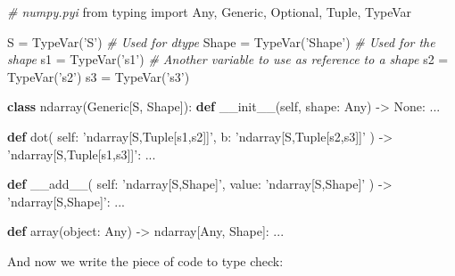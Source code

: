 \documentclass[
11pt, %
english, %
singlespacing, %
headsepline, %
]{MastersDoctoralThesis} %
\newenvironment{Shaded}{}{}
\newcommand{\BuiltInTok}[1]{#1}
\newcommand{\CommentTok}[1]{\textcolor[rgb]{0.38,0.63,0.69}{\textit{#1}}}
\newcommand{\FunctionTok}[1]{\textcolor[rgb]{0.02,0.16,0.49}{#1}}
\newcommand{\ImportTok}[1]{#1}
\newcommand{\KeywordTok}[1]{\textcolor[rgb]{0.00,0.44,0.13}{\textbf{#1}}}
\newcommand{\NormalTok}[1]{#1}
\newcommand{\OperatorTok}[1]{\textcolor[rgb]{0.40,0.40,0.40}{#1}}
\newcommand{\StringTok}[1]{\textcolor[rgb]{0.25,0.44,0.63}{#1}}
\newcommand{\VariableTok}[1]{\textcolor[rgb]{0.10,0.09,0.49}{#1}}
\begin{document}
\begin{Shaded}
\begin{Highlighting}[]
\CommentTok{# numpy.pyi}
\ImportTok{from}\NormalTok{ typing }\ImportTok{import}\NormalTok{ Any, Generic, Optional, Tuple, TypeVar}

\NormalTok{S }\OperatorTok{=}\NormalTok{ TypeVar(}\StringTok{'S'}\NormalTok{)  }\CommentTok{# Used for dtype}
\NormalTok{Shape }\OperatorTok{=}\NormalTok{ TypeVar(}\StringTok{'Shape'}\NormalTok{)  }\CommentTok{# Used for the shape}
\NormalTok{s1 }\OperatorTok{=}\NormalTok{ TypeVar(}\StringTok{'s1'}\NormalTok{)  }\CommentTok{# Another variable to use as reference to a shape}
\NormalTok{s2 }\OperatorTok{=}\NormalTok{ TypeVar(}\StringTok{'s2'}\NormalTok{)}
\NormalTok{s3 }\OperatorTok{=}\NormalTok{ TypeVar(}\StringTok{'s3'}\NormalTok{)}


\KeywordTok{class}\NormalTok{ ndarray(Generic[S, Shape]):}
    \KeywordTok{def} \FunctionTok{__init__}\NormalTok{(}\VariableTok{self}\NormalTok{, shape: Any) }\OperatorTok{->} \VariableTok{None}\NormalTok{: ...}

    \KeywordTok{def}\NormalTok{ dot(}
            \VariableTok{self}\NormalTok{: }\StringTok{'ndarray[S,Tuple[s1,s2]]'}\NormalTok{,}
\NormalTok{            b: }\StringTok{'ndarray[S,Tuple[s2,s3]]'}
\NormalTok{    ) }\OperatorTok{->} \StringTok{'ndarray[S,Tuple[s1,s3]]'}\NormalTok{: ...}

    \KeywordTok{def} \FunctionTok{__add__}\NormalTok{(}
            \VariableTok{self}\NormalTok{: }\StringTok{'ndarray[S,Shape]'}\NormalTok{,}
\NormalTok{            value: }\StringTok{'ndarray[S,Shape]'}
\NormalTok{    ) }\OperatorTok{->} \StringTok{'ndarray[S,Shape]'}\NormalTok{: ...}


\KeywordTok{def}\NormalTok{ array(}\BuiltInTok{object}\NormalTok{: Any) }\OperatorTok{->}\NormalTok{ ndarray[Any, Shape]: ...}
\end{Highlighting}
\end{Shaded}

And now we write the piece of code to type check:
\end{document}
